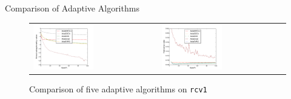 \begin{frame}{Comparison of Adaptive Algorithms}
\begin{figure}[htbp]
\begin{tabular}{ll}
    \centering
        \includegraphics[width=0.5\textwidth]{images/comp_adas_obej.pdf} &
        \includegraphics[width=0.5\textwidth]{images/comp_adas_terror.pdf}
        \end{tabular}
    \caption{Comparison of five adaptive algorithms on \texttt{rcv1}} 
    \label{fig:ada_all1}
\end{figure}
\end{frame}

